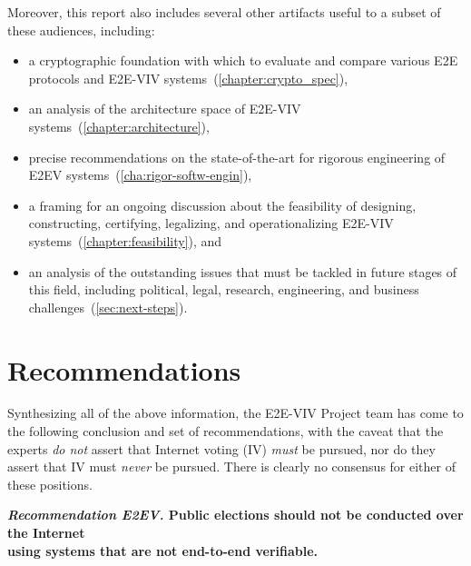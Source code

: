 Moreover, this report also includes several other artifacts useful to
a subset of these audiences, including:
\begin{itemize}
\item a cryptographic foundation with which to evaluate and compare
  various E2E protocols and E2E-VIV
  systems~(\autoref{chapter:crypto_spec}),
\item an analysis of the architecture space of E2E-VIV
  systems~(\autoref{chapter:architecture}),
\item precise recommendations on the state-of-the-art for rigorous
  engineering of E2EV systems~(\autoref{cha:rigor-softw-engin}),
\item a framing for an ongoing discussion about the feasibility of
  designing, constructing, certifying, legalizing, and operationalizing
  E2E-VIV systems~(\autoref{chapter:feasibility}), and
\item an analysis of the outstanding issues that must be tackled in
  future stages of this field, including political, legal, research,
  engineering, and business challenges~(\autoref{sec:next-steps}).
\end{itemize}

\section{Recommendations}

Synthesizing all of the above information, the E2E-VIV Project team
has come to the following conclusion and set of recommendations, with
the caveat that the experts \emph{do not} assert that Internet voting
(IV) \emph{must} be pursued, nor do they assert that IV must
\emph{never} be pursued. There is clearly no consensus for either of
these positions.

\begin{center}
  \textbf{\emph{Recommendation E2EV.} Public elections should not be
    conducted over the Internet\\
    using systems that are not end-to-end verifiable.}
\end{center}

